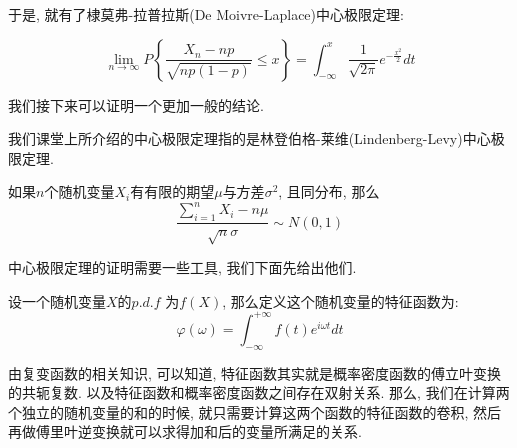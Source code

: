				于是, 就有了棣莫弗-拉普拉斯(De Moivre-Laplace)中心极限定理:
				
				\begin{theorem}
					\begin{equation}						
						\lim_{n \rightarrow \infty} P\left\{\frac	{X_n -np}{\sqrt{np(1-p)}} \le x\right\} = \int_{-\infty}^{x} \frac{1}{\sqrt{2 \pi}} e^{-\frac{x^2}{2}} dt
					\end{equation}
				\end{theorem}
				
				
				我们接下来可以证明一个更加一般的结论.
				
		我们课堂上所介绍的中心极限定理指的是林登伯格-莱维(Lindenberg-Levy)中心极限定理. 
		\begin{theorem}
			如果$n$个随机变量$X_i$有有限的期望$\mu$与方差$\sigma^2$, 且同分布, 那么
			\begin{equation}
				\frac{\sum_{i=1}^n X_i - n\mu}{\sqrt{n} \sigma} \sim N(0,1)
			\end{equation}
		\end{theorem}
		中心极限定理的证明需要一些工具, 我们下面先给出他们.
		
		\begin{definition}			
			设一个随机变量$ X$的$p.d.f$ 为$f(X)$, 那么定义这个随机变量的特征函数为:
			\begin{equation}
				\varphi(\omega) = \int_{-\infty}^{+\infty} f(t) e^{i\omega t} dt
			\end{equation}
		\end{definition}
		
		由复变函数的相关知识, 可以知道, 特征函数其实就是概率密度函数的傅立叶变换的共轭复数. 以及特征函数和概率密度函数之间存在双射关系.
		那么, 我们在计算两个独立的随机变量的和的时候, 就只需要计算这两个函数的特征函数的卷积, 然后再做傅里叶逆变换就可以求得加和后的变量所满足的关系.
		
